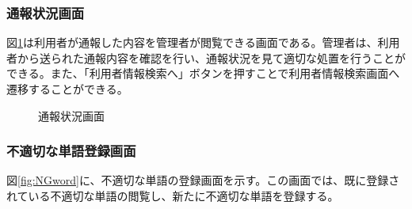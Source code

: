 \documentclass[a4j]{jarticle}
\begin{document}
\subsubsection{通報状況画面}
図\ref{fig:report_admin}は利用者が通報した内容を管理者が閲覧できる画面である。管理者は、利用者から送られた通報内容を確認を行い、通報状況を見て適切な処置を行うことができる。また、「利用者情報検索へ」ボタンを押すことで利用者情報検索画面へ遷移することができる。
\begin{figure}[H]
\begin{center}
\caption{通報状況画面}
\label{fig:report_admin}
\end{center}
\end{figure}

\subsubsection{不適切な単語登録画面}
図\ref{fig:NGword}に、不適切な単語の登録画面を示す。この画面では、既に登録されている不適切な単語の閲覧し、新たに不適切な単語を登録する。
\end{document}
